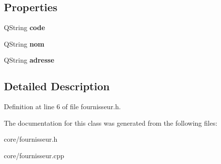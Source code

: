 \subsection*{Properties}
\begin{DoxyCompactItemize}
\item 
\hypertarget{class_fournisseur_a28a5068c1ba3b22133e0dbdae9c42fdc}{
QString {\bfseries code}}
\label{de/d1a/class_fournisseur_a28a5068c1ba3b22133e0dbdae9c42fdc}

\item 
\hypertarget{class_fournisseur_ab887a1c4585489235c26a5cb2c14cb0f}{
QString {\bfseries nom}}
\label{de/d1a/class_fournisseur_ab887a1c4585489235c26a5cb2c14cb0f}

\item 
\hypertarget{class_fournisseur_ae42a1aa45300ba7a145e7b46eeaeedcb}{
QString {\bfseries adresse}}
\label{de/d1a/class_fournisseur_ae42a1aa45300ba7a145e7b46eeaeedcb}

\end{DoxyCompactItemize}


\subsection{Detailed Description}


Definition at line 6 of file fournisseur.h.



The documentation for this class was generated from the following files:\begin{DoxyCompactItemize}
\item 
core/fournisseur.h\item 
core/fournisseur.cpp\end{DoxyCompactItemize}
